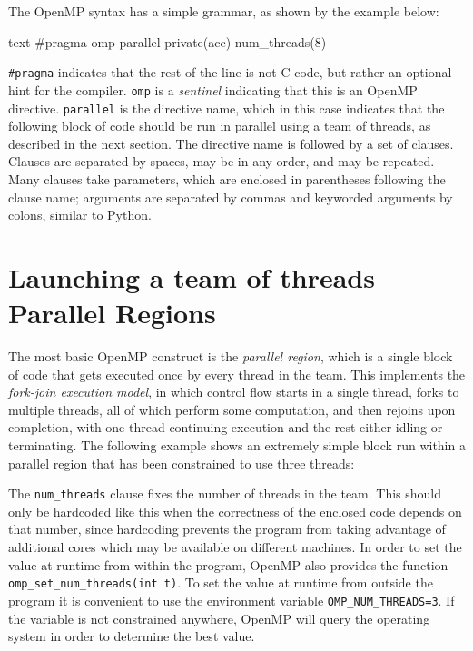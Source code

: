 \documentclass[conference, a4paper]{IEEEtran-modified}
\begin{document}
    The OpenMP syntax has a simple grammar, as shown by the example below:
      \begin{ccode}[]
        {text}
        #pragma omp parallel private(acc) num_threads(8)
      \end{ccode}

    \texttt{\#pragma} indicates that the rest of the line is not C code, but rather an optional hint for the compiler. \texttt{omp} is a \emph{sentinel} indicating that this is an OpenMP directive. \texttt{parallel} is the directive name, which in this case indicates that the following block of code should be run in parallel using a team of threads, as described in the next section. The directive name is followed by a set of clauses. Clauses are separated by spaces, may be in any order, and may be repeated. Many clauses take parameters, which are enclosed in parentheses following the clause name; arguments are separated by commas and keyworded arguments by colons, similar to Python.
    


\section{Launching a team of threads --- Parallel Regions}

    The most basic OpenMP construct is the \emph{parallel region}, which is a single block of code that gets executed once by every thread in the team. This implements the \emph{fork-join execution model}, in which control flow starts in a single thread, forks to multiple threads, all of which perform some computation, and then rejoins upon completion, with one thread continuing execution and the rest either idling or terminating. The following example shows an extremely simple block run within a parallel region that has been constrained to use three threads:


    The \texttt{num\_threads} clause fixes the number of threads in the team. This should only be hardcoded like this when the correctness of the enclosed code depends on that number, since hardcoding prevents the program from taking advantage of additional cores which may be available on different machines. In order to set the value at runtime from within the program, OpenMP also provides the function \texttt{omp_set_num_threads(int t)}. To set the value at runtime from outside the program it is convenient to use the environment variable \texttt{OMP_NUM_THREADS=3}. If the variable is not constrained anywhere, OpenMP will query the operating system in order to determine the best value. 
\end{document}
